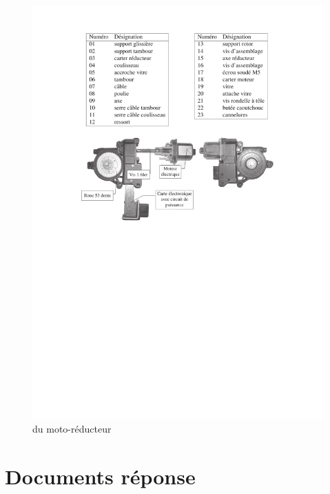\begin{figure}[!h]
 \centering\includegraphics[width=0.9\linewidth]{img/eclate2}
 \caption{ du moto-réducteur}
 \label{an02}
\end{figure}


\newpage
\cleardoublepage

\pagestyle{documentreponse}

\section{Documents réponse}


